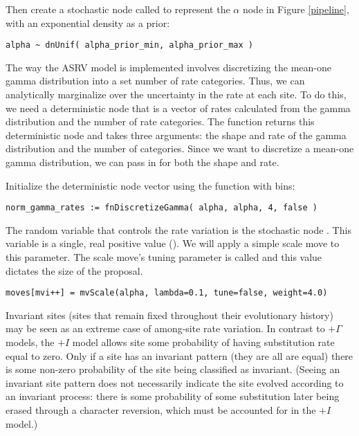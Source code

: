 Then create a stochastic node called  to represent the $\alpha$ node in Figure \ref{pipeline}, with an exponential density as a prior:
{\tt\begin{snugshade*}
\begin{lstlisting}
alpha ~ dnUnif( alpha_prior_min, alpha_prior_max )
\end{lstlisting}
\end{snugshade*}}

The way the ASRV model is implemented involves discretizing the mean-one gamma distribution into a set number of rate categories. Thus, we can analytically marginalize over the uncertainty in the rate at each site. To do this, we need a deterministic node that is a vector of rates calculated from the gamma distribution and the number of rate categories. The  function returns this deterministic node and takes three arguments: the shape and rate of the gamma distribution and the number of categories. Since we want to discretize a mean-one gamma distribution, we can pass in  for both the shape and rate.

Initialize the  deterministic node vector using the   function with  bins:
{\tt \begin{snugshade*}
\begin{lstlisting}
norm_gamma_rates := fnDiscretizeGamma( alpha, alpha, 4, false )
\end{lstlisting}
\end{snugshade*}}

The random variable that controls the rate variation is the stochastic node . This variable is a single, real positive value (). 
We will apply a simple scale move to this parameter.
The scale move's tuning parameter is called  and this value dictates the size of the proposal.
{\tt \begin{snugshade*}
\begin{lstlisting}
moves[mvi++] = mvScale(alpha, lambda=0.1, tune=false, weight=4.0)
\end{lstlisting}
\end{snugshade*}}

Invariant sites (sites that remain fixed throughout their evolutionary history) may be seen as an extreme case of among-site rate variation.
In contrast to $+ \Gamma$ models, the $+I$ model allows site some probability of having substitution rate equal to zero.
Only if a site has an invariant pattern (they are all are equal) there is some non-zero probability of the site being classified as invariant.
(Seeing an invariant site pattern does not necessarily indicate the site evolved according to an invariant process: there is some probability of some substitution later being erased through a character reversion, which must be accounted for in the $+I$ model.)

